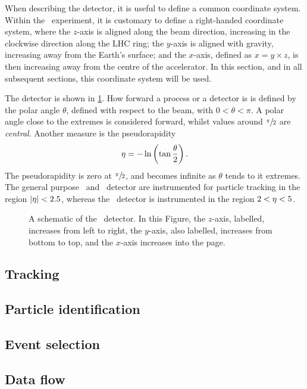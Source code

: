 When describing the detector, it is useful to define a common coordinate 
system.
Within the \lhcb\ experiment, it is customary to define a right-handed 
coordinate system, where the $z$-axis is aligned along the beam direction, 
increasing in the clockwise direction along the \ac{LHC} ring; the $y$-axis is 
aligned with gravity, increasing away from the Earth's surface; and the 
$x$-axis, defined as $x = y \times z$, is then increasing away from the centre 
of the accelerator.
In this section, and in all subsequent sections, this coordinate system will be 
used.

The detector is shown in \cref{fig:intro:lhcb:detector}.
How forward a process or a detector is is defined by the polar angle $\theta$, 
defined with respect to the beam, with $0 < \theta < \pi$.
A polar angle close to the extremes is considered forward, whilst values around 
$\sfrac{\pi}{2}$ are \emph{central}.
Another measure is the pseudorapidity
\begin{equation}
  \eta = -\ln\left(\tan{\frac{\theta}{2}}\right).
  \label{eqn:intro:lhcb:pseudorapidity}
\end{equation}
The pseudorapidity is zero at $\sfrac{\pi}{2}$, and becomes infinite as 
$\theta$ tends to it extremes.
The general purpose \atlas\ and \cms\ detector are instrumented for particle 
tracking in the region $|\eta| < 2.5$, whereas the \lhcb\ detector is 
instrumented in the region $2 < \eta < 5$.

\begin{figure}
  \centering
  
  \caption{%
    A schematic of the \lhcb\ detector.
    In this Figure, the $z$-axis, labelled, increases from left to right, the 
    $y$-axis, also labelled, increases from bottom to top, and the $x$-axis 
    increases into the page.
  }
  \label{fig:intro:lhcb:detector}
\end{figure}

\subsection{Tracking}
\label{chap:intro:lhcb:detector:tracking}

\subsection{Particle identification}
\label{chap:intro:lhcb:detector:pid}

\subsection{Event selection}
\label{chap:intro:lhcb:detector:trigger}

\subsection{Data flow}
\label{chap:intro:lhcb:detector:dataflow}
